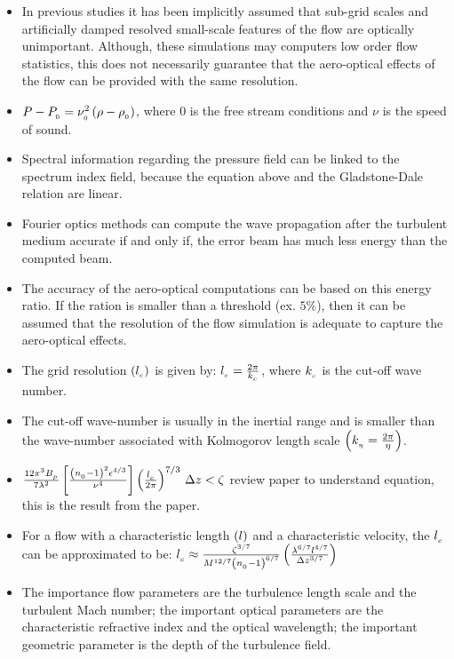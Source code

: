 \begin{itemize}
            \item In previous studies it has been implicitly assumed that sub-grid scales and artificially damped resolved small-scale features of the flow are optically unimportant. Although, these simulations may computers low order flow statistics, this does not necessarily guarantee that the aero-optical effects of the flow can be provided with the same resolution.
            \item $ P - P_{_{0}} = \nu_{_{0}}^2\left(\rho - \rho_{_{0}} \right) $, where $0$ is the free stream conditions and $\nu$ is the speed of sound.
            \item Spectral information regarding the pressure field can be linked to the spectrum index field, because the equation above and the Gladstone-Dale relation are linear. 
            \item Fourier optics methods can compute the wave propagation after the turbulent medium accurate if and only if, the error beam has much less energy than the computed beam.  
            \item The accuracy of the aero-optical computations can be based on this energy ratio. If the ration is smaller than a threshold (ex. $5\%$), then it can be assumed that the resolution of the flow simulation is adequate to capture the aero-optical effects.  
            \item The grid resolution $\left(l_{_{c}}\right)$ is given by: $l_{_{c}} = \frac{2\pi}{k_{_{c}}}$, where $k_{_{c}}$ is the cut-off wave number.  
            \item The cut-off wave-number is usually in the inertial range and is smaller than the wave-number associated with Kolmogorov length scale $\left(k_{_{\eta}} = \frac{2\pi}{\eta} \right)$. 
            \item $\frac{12\pi^3B_{_{p}}}{7\lambda^2}\left[\frac{\left(n_{_{0}} -1\right)^2 \epsilon^{4/3}}{\nu^4}\right]\left(\frac{l_{_{c}}}{2\pi}\right)^{7/3}\,\Delta z < \zeta $ review paper to understand equation, this is the result from the paper. 
            \item For a flow with a characteristic length $\left(l\right)$ and a characteristic velocity, the $l_{_{c}}$ can be approximated to be: $l_{_{c}} \approx \frac{\zeta^{3/7}}{M^{12/7}\left(n_{_{0}} - 1 \right)^{6/7}}\left(\frac{\lambda^{6/7} l^{4/7}}{\Delta z^{3/7}}\right) $ 
            \item The importance flow parameters are the turbulence length scale and the turbulent Mach number; the important optical parameters are the characteristic refractive index and the optical wavelength; the important geometric parameter is the depth of the turbulence field. 

\end{itemize}
